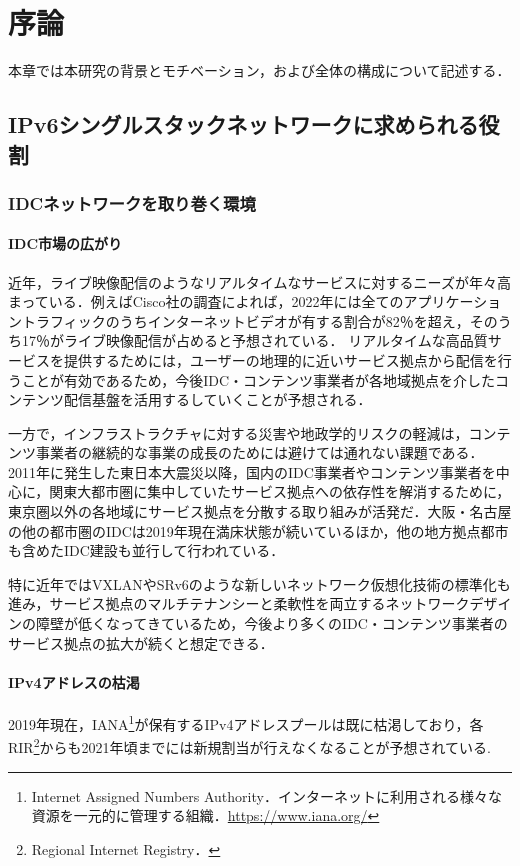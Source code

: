 \chapter{序論}
\label{introduction}
本章では本研究の背景とモチベーション，および全体の構成について記述する．

\section{IPv6シングルスタックネットワークに求められる役割}
\label{introduction:background}

\subsection{IDCネットワークを取り巻く環境}
\subsubsection{IDC市場の広がり}


近年，ライブ映像配信のようなリアルタイムなサービスに対するニーズが年々高まっている．例えばCisco社の調査\cite{index2017global}によれば，2022年には全てのアプリケーショントラフィックのうちインターネットビデオが有する割合が82％を超え，そのうち17％がライブ映像配信が占めると予想されている．
リアルタイムな高品質サービスを提供するためには，ユーザーの地理的に近いサービス拠点から配信を行うことが有効であるため，今後IDC・コンテンツ事業者が各地域拠点を介したコンテンツ配信基盤を活用するしていくことが予想される．

一方で，インフラストラクチャに対する災害や地政学的リスクの軽減は，コンテンツ事業者の継続的な事業の成長のためには避けては通れない課題である\cite{alonso2001business}．
2011年に発生した東日本大震災以降，国内のIDC事業者やコンテンツ事業者を中心に，関東大都市圏に集中していたサービス拠点への依存性を解消するために，東京圏以外の各地域にサービス拠点を分散する取り組みが活発だ\cite{JANOG44_robust}．大阪・名古屋の他の都市圏のIDCは2019年現在満床状態が続いているほか，他の地方拠点都市も含めたIDC建設も並行して行われている．　

特に近年ではVXLANやSRv6のような新しいネットワーク仮想化技術の標準化も進み，サービス拠点のマルチテナンシーと柔軟性を両立するネットワークデザインの障壁が低くなってきているため，今後より多くのIDC・コンテンツ事業者のサービス拠点の拡大が続くと想定できる．


\subsubsection{IPv4アドレスの枯渇}
\label{introduction:background:ipv4_problems}
2019年現在，IANA\footnote{Internet Assigned Numbers Authority．インターネットに利用される様々な資源を一元的に管理する組織．\url{https://www.iana.org/}}が保有するIPv4アドレスプールは既に枯渇しており\cite{IANA_allocation}，各RIR\footnote{Regional Internet Registry．}からも2021年頃までには新規割当が行えなくなることが予想されている\cite{potaroo_IPv4}.

